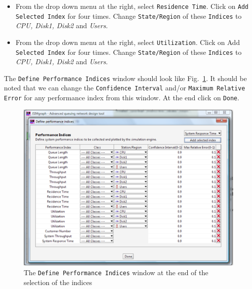 \begin{itemize}
\item From the drop down menu at the right, select
\texttt{Residence Time}. Click on \texttt{Add Selected Index} for
four times. Change \texttt{State/Region} of these \texttt{Indices}
to \emph{CPU, Disk1, Disk2} and \emph{Users}.

\item From the drop down menu at the right, select
\texttt{Utilization}. Click on Add \texttt{Selected Index} for
four times. Change \texttt{State/Region} of these \texttt{Indices}
to \emph{CPU, Disk1, Disk2} and \emph{Users}.
\end{itemize}
The \texttt{Define Performance Indices} window should look like
Fig.~\ref{fig:globperindw}. It should be noted that we can change
the \texttt{Confidence Interval} and/or \texttt{Maximum Relative
Error} for any performance index from this window. At the end
click on \texttt{Done}.\\
\begin{figure}[htb]
    \begin{center}
        \includegraphics[scale=.5]{img/jsimg/12.13.eps}
    \end{center}
    \caption{The \texttt{Define Performance Indices} window at the end
    of the selection of the indices}
    \label{fig:globperindw}
\end{figure}

